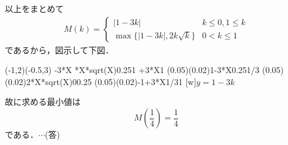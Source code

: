 \documentclass[a4j]{jarticle}
\begin{document}
\begin{multicols}{2}
 以上をまとめて
      \begin{align}
      M(k)=
           \begin{cases}
           |1-3k|&k\le0,1\le k \\
           \max\{|1-3k|,2k\sqrt{k}\}&0<k\le1
           \end{cases}
      \end{align}
 であるから，図示して下図．\\
 
      \begin{zahyou}[ul=20mm,yokozikukigou=$k$](-1,2)(-0.5,3)
      \def\Fx{1-3*X}
      \def\Hx{-1+3*X}
      \def\Gx{2*X*sqrt(X)}
      \YGurafu*[migix=0.25]\Fx
      \YGurafu\Gx{0.25}{1}
      \YGurafu\Hx{1}{\xmax}
      \YGurafu(0.05)(0.02)\Fx{0.25}{1/3}
      \YGurafu(0.05)(0.02)\Gx{0}{0.25}
      \YGurafu(0.05)(0.02)\Hx{1/3}{1}
      \Put\A[syaei=xy,xlabel=1,ylabel=2]{}
      \Put\B[syaei=xy,xlabel=\frac{1}{4},ylabel=\frac{1}{4}]{}
      \Put{}
      [w]{$y=1-3k$}
      \end{zahyou}
      
故に求める最小値は
     \[M\left(\frac{1}{4}\right)=\frac{1}{4}\]      
である．$\cdots$(答)
      
\newpage
\end{multicols}
\end{document}
